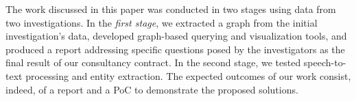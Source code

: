 




The work discussed in this paper was conducted in two stages using data from two investigations. In the \textit{first stage}, we extracted a graph from the initial investigation's data, developed graph-based querying and visualization tools, and produced a report addressing specific questions posed by the investigators as the final result of our consultancy contract. In the second stage, we tested speech-to-text processing and entity extraction. The expected outcomes of our work consist, indeed, of a report and a PoC to demonstrate the proposed solutions.

